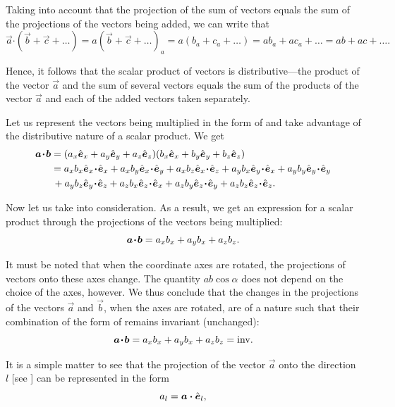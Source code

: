 Taking into account that the projection of the sum of vectors equals the sum of the projections of the vectors being added, we can write that
\begin{equation}\label{eq:1_22}
\vec{a}\boldsymbol{\cdot}(\vec{b}+\vec{c}+\ldots) = a(\vec{b}+\vec{c}+\ldots)_a = a(b_a+c_a+\ldots) = ab_a+ac_a+\ldots = ab+ac+\ldots .
\end{equation}

\noindent
Hence, it follows that the scalar product of vectors is distributive---the product of the vector $\vec{a}$ and the sum of several vectors equals the sum of the products of the vector $\vec{a}$ and each of the added vectors taken separately.

Let us represent the vectors being multiplied in the form of  and take advantage of the distributive nature of a scalar product. We get
\begin{align*}
\vecdot{a}{b} &= (a_x\vecuni{x} + a_y\vecuni{y} + a_z\vecuni{z})(b_x\vecuni{x} + b_y\vecuni{y} + b_z\vecuni{z})\\
&= a_xb_x\vecunidot{x}{x} + a_xb_y\vecunidot{x}{y} + a_xb_z\vecunidot{x}{z} + a_yb_x\vecunidot{y}{x} + a_yb_y\vecunidot{y}{y}\\
&\,+ a_yb_z\vecunidot{y}{z}+ a_zb_x\vecunidot{z}{x} + a_zb_y\vecunidot{z}{y} + a_zb_z\vecunidot{z}{z}.
\end{align*}

\noindent
Now let us take  into consideration. As a result, we get an expression for a scalar product through the projections of the vectors being multiplied:
\begin{equation}\label{eq:1_23}
\boldsymbol{a\!\cdot\!b} = a_xb_x + a_yb_x + a_zb_z.
\end{equation}

\noindent
It must be noted that when the coordinate axes are rotated, the projections of vectors onto these axes change. The quantity $ab\cos\alpha$ does not depend on the choice of the axes, however. We thus conclude that the changes in the projections of the vectors $\vec{a}$ and $\vec{b}$, when the axes are rotated, are of a nature such that their combination of the form of  remains invariant (unchanged):
\begin{equation}\label{eq:1_24}
\boldsymbol{a\!\cdot\!b} = a_xb_x + a_yb_x + a_zb_z = \mathrm{inv}.
\end{equation}

It is a simple matter to see that the projection of the vector $\vec{a}$ onto the direction $l$ [see ] can be represented in the form
\begin{equation}\label{eq:1_25}
a_l = \boldsymbol{a}\boldsymbol{\cdot}\hat{\boldsymbol{e}}_{l},
\end{equation}

